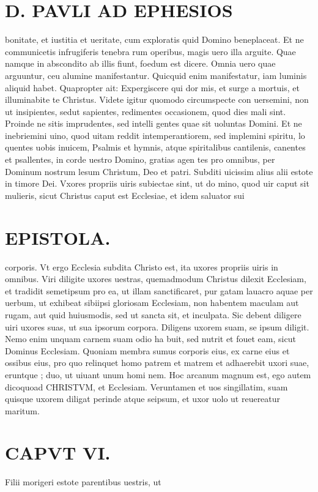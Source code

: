 \documentclass{article}
\begin{document}
\begin{pages}
\section*{D. PAVLI AD EPHESIOS }
\marginpar{[ p.6.  ]}
\marginpar{[ p.7.  ]}
\marginpar{[ p.8.  ]}
\marginpar{[ p.9.  ]}\pstart bonitate, et iustitia et ueritate, cum exploratis quid Domino beneplaceat.  \pend\pstart Et ne communicetis infrugiferis tenebra rum operibus, magis uero illa arguite. Quae namque in abscondito ab illis fiunt, foedum est dicere. Omnia uero quae arguuntur, ceu alumine manifestantur. Quicquid enim manifestatur, iam luminis aliquid habet. Quapropter ait: Expergiscere qui dor mis, et surge a mortuis, et illuminabite te Christus.  \pend\pstart Videte igitur quomodo circumspecte con uersemini, non ut insipientes, sedut sapientes, redimentes occasionem, quod dies mali sint. Proinde ne sitis imprudentes, sed intelli gentes quae sit uoluntas Domini.  \pend\pstart Et ne inebriemini uino, quod uitam reddit intemperantiorem, sed implemini spiritu, lo quentes uobis inuicem, Psalmis et hymnis, atque  spiritalibus cantilenis, canentes et psallentes, in corde uestro Domino, gratias agen tes pro omnibus, per Dominum nostrum lesum Christum, Deo et patri.  \pend\pstart Subditi uicissim alius alii estote in timore Dei.  Vxores propriis uiris subiectae sint, ut do mino, quod uir caput sit mulieris, sicut Christus caput est Ecclesiae, et idem saluator sui  \pend
\section*{EPISTOLA.  }
\marginpar{[ p.15 ]}
\marginpar{[ p.10.  ]}
\marginpar{[ p.11.  ]}
\marginpar{[ p.1. ]}\pstart corporis. Vt ergo Ecclesia subdita Christo est, ita uxores propriis uiris in omnibus.  \pend\pstart Viri diligite uxores uestras, quemadmodum Christus dilexit Ecclesiam, et tradidit semetipsum pro ea, ut illam sanctificaret, pur gatam lauacro aquae per uerbum, ut exhibeat sibiipsi gloriosam Ecclesiam, non habentem maculam aut rugam, aut quid huiusmodis, sed ut sancta sit, et inculpata. Sic debent diligere uiri uxores suas, ut sua ipsorum corpora. Diligens uxorem suam, se ipsum diligit. Nemo enim unquam carnem suam odio ha buit, sed nutrit et fouet eam, sicut Dominus Ecclesiam.  \pend\pstart Quoniam membra sumus corporis eius, ex carne eius et ossibus eius, pro quo relinquet homo patrem et matrem et adhaerebit uxori suae, eruntque ; duo, ut uiuant unum homi nem. Hoc arcanum magnum est, ego autem dicoquoad CHRISTVM, et Ecclesiam. Veruntamen et uos singillatim, suam quisque  uxorem diligat perinde atque seipsum, et uxor uolo ut reuereatur maritum.  \pend
\endnumbering\beginnumbering\section{CAPVT VI.}\pstart Filii morigeri estote parentibus uestris, ut  \pend

\end{pages}
\end{document}
